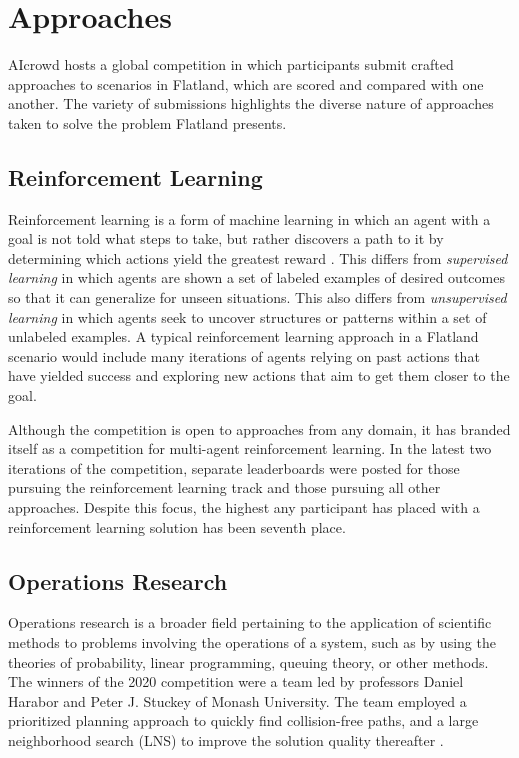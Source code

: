\documentclass[11pt]{article}
\begin{document}
\section{Approaches}
AIcrowd \citep{baeiegljmomonyspwaaggo21a} hosts a global competition in which participants submit crafted approaches to scenarios in Flatland, which are scored and compared with one another.  The variety of submissions highlights the diverse nature of approaches taken to solve the problem Flatland presents.

\subsection{Reinforcement Learning}
Reinforcement learning is a form of machine learning in which an agent with a goal is not told what steps to take, but rather discovers a path to it by determining which actions yield the greatest reward \citep{sutton18a}.  This differs from \textit{supervised learning} in which agents are shown a set of labeled examples of desired outcomes so that it can generalize for unseen situations.  This also differs from \textit{unsupervised learning} in which agents seek to uncover structures or patterns within a set of unlabeled examples.  A typical reinforcement learning approach in a Flatland scenario would include many iterations of agents relying on past actions that have yielded success and exploring new actions that aim to get them closer to the goal.

Although the competition is open to approaches from any domain, it has branded itself as a competition for multi-agent reinforcement learning.  In the latest two iterations of the competition, separate leaderboards were posted for those pursuing the reinforcement learning track and those pursuing all other approaches.  Despite this focus, the highest any participant has placed with a reinforcement learning solution has been seventh place.

\subsection{Operations Research}
Operations research \citep{gupta92a} is a broader field pertaining to the application of scientific methods to problems involving the operations of a system, such as by using the theories of probability, linear programming, queuing theory, or other methods.  The winners of the 2020 competition were a team led by professors Daniel Harabor and Peter J. Stuckey of Monash University.  The team employed a prioritized planning approach to quickly find collision-free paths, and a large neighborhood search (LNS) to improve the solution quality thereafter \citep{lichzhchhastmako21a}.
\end{document}
